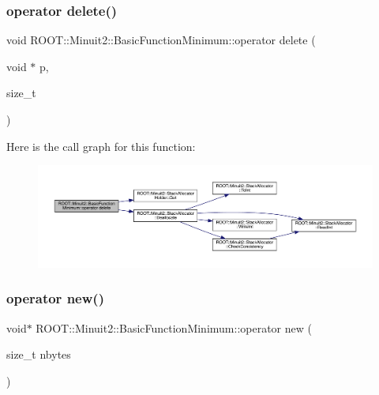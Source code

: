 \subsubsection{\texorpdfstring{operator delete()}{operator delete()}\hspace{0.1cm}{\footnotesize\ttfamily [3/3]}}
{\footnotesize\ttfamily void R\+O\+O\+T\+::\+Minuit2\+::\+Basic\+Function\+Minimum\+::operator delete (\begin{DoxyParamCaption}\item[{void $\ast$}]{p,  }\item[{size\+\_\+t}]{ }\end{DoxyParamCaption})\hspace{0.3cm}{\ttfamily [inline]}}

Here is the call graph for this function\+:
\nopagebreak
\begin{figure}[H]
\begin{center}
\leavevmode
\includegraphics[width=350pt]{de/d25/classROOT_1_1Minuit2_1_1BasicFunctionMinimum_ab9d53fd0c21ac6456afdb233e4cbaf1b_cgraph}
\end{center}
\end{figure}
\mbox{\label{classROOT_1_1Minuit2_1_1BasicFunctionMinimum_a49a32bdb3ff21202fcfa9a9e42015b8f}} 
\subsubsection{\texorpdfstring{operator new()}{operator new()}\hspace{0.1cm}{\footnotesize\ttfamily [1/3]}}
{\footnotesize\ttfamily void$\ast$ R\+O\+O\+T\+::\+Minuit2\+::\+Basic\+Function\+Minimum\+::operator new (\begin{DoxyParamCaption}\item[{size\+\_\+t}]{nbytes }\end{DoxyParamCaption})\hspace{0.3cm}{\ttfamily [inline]}}

